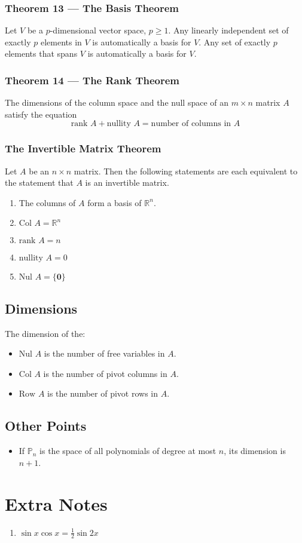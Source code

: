 \documentclass{article}
\begin{document}
\subsubsection*{Theorem 13 --- The Basis Theorem}
Let $V$ be a $p$-dimensional vector space, $p\geq 1$. Any linearly independent set of exactly $p$ elements in $V$ is automatically a basis for $V$. Any set of exactly $p$ elements that spans $V$ is automatically a basis for $V$.

\subsubsection*{Theorem 14 --- The Rank Theorem}
The dimensions of the column space and the null space of an $m\times n$ matrix $A$ satisfy the equation
\[\text{rank }A+\text{nullity }A=\text{number of columns in }A\]

\subsubsection*{The Invertible Matrix Theorem}
Let $A$ be an $n\times n$ matrix. Then the following statements are each equivalent to the statement that $A$ is an invertible matrix.
\begin{enumerate}
    \item The columns of $A$ form a basis of $\mathbb{R}^n$.
    \item $\text{Col }A=\mathbb{R}^n$
    \item $\text{rank }A=n$
    \item $\text{nullity }A=0$
    \item $\text{Nul }A=\{\mathbf{0}\}$
\end{enumerate}

\subsection*{Dimensions}
The dimension of the:
\begin{itemize}
    \item $\text{Nul }A$ is the number of free variables in $A$.
    \item $\text{Col }A$ is the number of pivot columns in $A$.
    \item $\text{Row }A$ is the number of pivot rows in $A$.
\end{itemize}

\subsection*{Other Points}
\begin{itemize}
    \item If $\mathbb{P}_n$ is the space of all polynomials of degree at most $n$, its dimension is $n+1$.
\end{itemize}

\section*{Extra Notes}
\begin{enumerate}
    \item $\sin x \cos x = \frac{1}{2} \sin 2x$
\end{enumerate}
\end{document}
